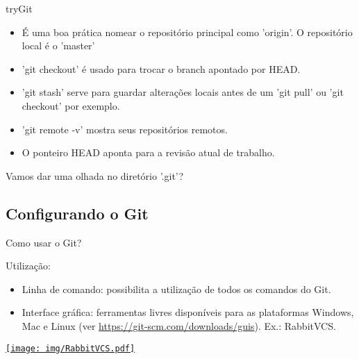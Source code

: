 \documentclass[a4paper]{beamer}
\begin{document}
\begin{frame}{tryGit}

\begin{itemize}
\item É uma boa prática nomear o repositório principal como 'origin'. O repositório local é o 'master'\pause
\item 'git checkout' é usado para trocar o branch apontado por HEAD.\pause
\item 'git stash' serve para guardar alterações locais antes de um 'git pull' ou 'git checkout' por exemplo.\pause
\item 'git remote -v' mostra seus repositórios remotos.\pause
\item O ponteiro HEAD aponta para a revisão atual de trabalho.\pause
\end{itemize}

\begin{center}
Vamos dar uma olhada no diretório '.git'?
\end{center}

\end{frame}

\subsection{Configurando o Git}

\begin{frame}{Como usar o Git?}

Utilização:
\begin{itemize}
\item Linha de comando: possibilita a utilização de todos os comandos do Git.
\item Interface gráfica: ferramentas livres disponíveis para as plataformas Windows, Mac e Linux (ver \url{https://git-scm.com/downloads/guis}). Ex.: RabbitVCS.
\end{itemize}

\begin{center}
\href{http://rabbitvcs.org/}{\texttt{[image: img/RabbitVCS.pdf]}}
\end{center}

\end{frame}
\end{document}
